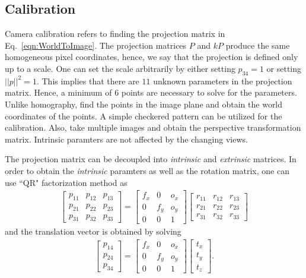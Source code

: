 \documentclass{report}
\begin{document}
\subsection{Calibration}
\hspace{\parindent}Camera calibration refers to finding the projection matrix in Eq.~\ref{eqn:WorldToImage}. The projection matrices $P$ and $kP$ produce the same homogeneous pixel coordinates, hence, we say that the projection is defined only up to a scale. One can set the scale arbitrarily by either setting $p_{34} = 1$ or setting $||p||^2 = 1$. This implies that there are $11$ unknown parameters in the projection matrix. Hence, a minimum of $6$ points are necessary to solve for the parameters. Unlike homography, find the points in the image plane and obtain the world coordinates of the points. A simple checkered pattern can be utilized for the calibration. Also, take multiple images and obtain the perspective transformation matrix. Intrinsic paramters are not affected by the changing views.

The projection matrix can be decoupled into \textit{intrinsic} and \textit{extrinsic} matrices. In order to obtain the \textit{intrinsic} paramters as well as the rotation matrix, one can use ``QR" factorization method as
\begin{align}
	\begin{bmatrix}
		p_{11} & p_{12} & p_{13} \\
		p_{21} & p_{22} & p_{23} \\
		p_{31} & p_{32} & p_{33}
	\end{bmatrix}
	=
	\begin{bmatrix}
		f_x & 0 & o_x \\
		0 & f_y & o_y \\
		0 & 0 & 1
	\end{bmatrix}
	\begin{bmatrix}
		r_{11} & r_{12} & r_{13} \\
		r_{21} & r_{22} & r_{23} \\
		r_{31} & r_{32} & r_{33}
	\end{bmatrix}
	\label{eqn:IntrinsicRotationDecoupled}
\end{align}
and the translation vector is obtained by solving
\begin{align}
	\begin{bmatrix}
		p_{14} \\
		p_{24} \\
		p_{34}
	\end{bmatrix}
	=
	\begin{bmatrix}
		f_x & 0 & o_x \\
		0 & f_y & o_y \\
		0 & 0 & 1
	\end{bmatrix}
	\begin{bmatrix}
		t_x \\
		t_y \\
		t_z
	\end{bmatrix}.
	\label{eqn:TranslationDecoupled}
\end{align}
\end{document}
